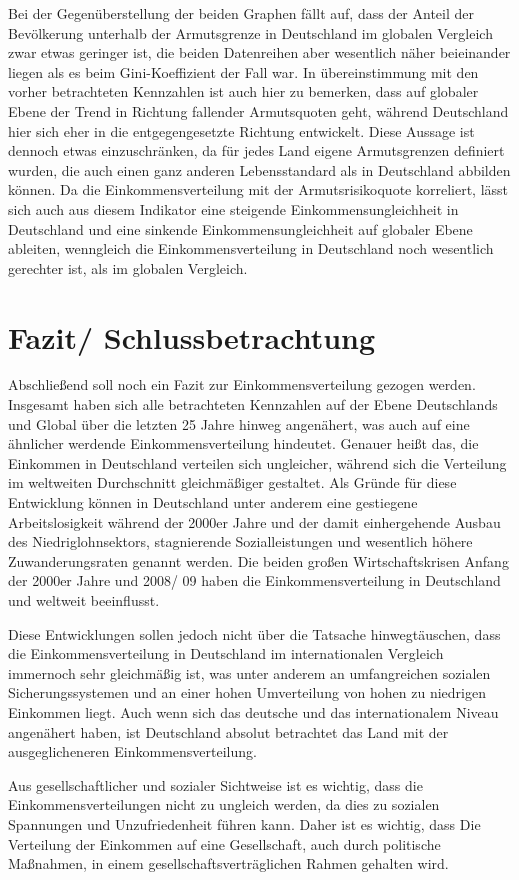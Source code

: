 Bei der Gegenüberstellung der beiden Graphen fällt auf, dass der Anteil der Bevölkerung unterhalb der Armutsgrenze in Deutschland im globalen Vergleich zwar etwas geringer ist, die beiden Datenreihen aber wesentlich näher beieinander liegen als es \zB beim Gini-Koeffizient der Fall war. In übereinstimmung mit den vorher betrachteten Kennzahlen ist auch hier zu bemerken, dass auf globaler Ebene der Trend in Richtung fallender Armutsquoten geht, während Deutschland hier sich eher in die entgegengesetzte Richtung entwickelt. Diese Aussage ist dennoch etwas einzuschränken, da für jedes Land eigene Armutsgrenzen definiert wurden, die auch einen ganz anderen Lebensstandard als in Deutschland abbilden können. Da die Einkommensverteilung mit der Armutsrisikoquote korreliert, lässt sich auch aus diesem Indikator eine steigende Einkommensungleichheit in Deutschland und eine sinkende Einkommensungleichheit auf globaler Ebene ableiten, wenngleich die Einkommensverteilung in Deutschland noch wesentlich gerechter ist, als im globalen Vergleich.

\chapter{Fazit/ Schlussbetrachtung}

Abschlie{\ss}end soll noch ein Fazit zur Einkommensverteilung gezogen werden. Insgesamt haben sich alle betrachteten Kennzahlen auf der Ebene Deutschlands und Global über die letzten 25 Jahre hinweg angenähert, was auch auf eine ähnlicher werdende Einkommensverteilung hindeutet. Genauer hei{\ss}t das, die Einkommen in Deutschland verteilen sich ungleicher, während sich die Verteilung im weltweiten Durchschnitt gleichmä{\ss}iger gestaltet. Als Gründe für diese Entwicklung können in Deutschland unter anderem eine gestiegene Arbeitslosigkeit während der 2000er Jahre und der damit einhergehende Ausbau des Niedriglohnsektors, stagnierende Sozialleistungen und wesentlich höhere Zuwanderungsraten genannt werden. Die beiden gro{\ss}en Wirtschaftskrisen Anfang der 2000er Jahre und 2008/ 09 haben die Einkommensverteilung in Deutschland und weltweit beeinflusst.

Diese Entwicklungen sollen jedoch nicht über die Tatsache hinwegtäuschen, dass die Einkommensverteilung in Deutschland im internationalen Vergleich immernoch sehr gleichmä{\ss}ig ist, was unter anderem an umfangreichen sozialen Sicherungssystemen und an einer hohen Umverteilung von hohen zu niedrigen Einkommen liegt. Auch wenn sich das deutsche und das internationalem Niveau angenähert haben, ist Deutschland absolut betrachtet das Land mit der ausgeglicheneren Einkommensverteilung.

Aus gesellschaftlicher und sozialer Sichtweise ist es wichtig, dass die Einkommensverteilungen nicht zu ungleich werden, da dies zu sozialen Spannungen und Unzufriedenheit führen kann. Daher ist es wichtig, dass Die Verteilung der Einkommen auf eine Gesellschaft, auch durch politische Ma{\ss}nahmen, in einem gesellschaftsverträglichen Rahmen gehalten wird.